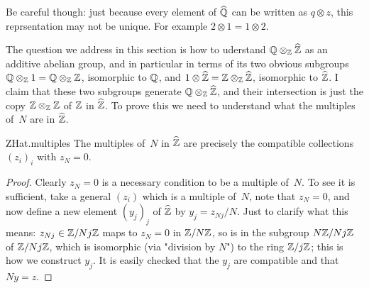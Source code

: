 Be careful though: just because every element of $\widehat{\mathbb{Q}}$ can be written as $q\otimes z$, this
reprsentation may not be unique. For example $2\otimes 1=1\otimes 2$.

The question we address in this section is how to uderstand $\mathbb{Q}\otimes_{\mathbb{Z}}\widehat{\mathbb{Z}}$ as an additive
abelian group, and in particular in terms of its two obvious subgroups $\mathbb{Q}\otimes_{\mathbb{Z}}1=\mathbb{Q}\otimes_{\mathbb{Z}}\mathbb{Z}$,
isomorphic to $\mathbb{Q}$, and $1\otimes\widehat{\mathbb{Z}}=\mathbb{Z}\otimes_{\mathbb{Z}}\widehat{\mathbb{Z}}$, isomorphic to $\widehat{\mathbb{Z}}$. I claim that these two
subgroups generate $\mathbb{Q}\otimes_{\mathbb{Z}}\widehat{\mathbb{Z}}$, and their intersection is just the copy $\mathbb{Z}\otimes_{\mathbb{Z}}\mathbb{Z}$ of $\mathbb{Z}$ in $\widehat{\mathbb{Z}}$.
To prove this we need to understand what the multiples of~$N$ are in $\widehat{\mathbb{Z}}$.

\begin{lemma}{ZHat.multiples} The multiples of~$N$ in $\widehat{\mathbb{Z}}$ are precisely the compatible collections $(z_i)_i$ with
$z_N=0$.
\end{lemma}
\begin{proof}
    Clearly $z_N=0$ is a necessary condition to be a multiple of~$N$. To see it is sufficient, take a general $(z_i)$
    which is a multiple of~$N$, note that $z_N=0$, and now define a new element $(y_j)_j$ of $\widehat{\mathbb{Z}}$
    by $y_j=z_{Nj}/N$. Just to clarify what this means: $z_{Nj}\in\mathbb{Z}/Nj\mathbb{Z}$ maps to $z_N=0$ in $\mathbb{Z}/N\mathbb{Z}$,
    so is in the subgroup $N\mathbb{Z}/Nj\mathbb{Z}$ of $\mathbb{Z}/Nj\mathbb{Z}$, which is isomorphic (via "division by $N$") to the
    ring $\mathbb{Z}/j\mathbb{Z}$; this is how we construct $y_j$. It is easily checked that the $y_j$ are compatible
    and that $Ny=z$.
\end{proof}


